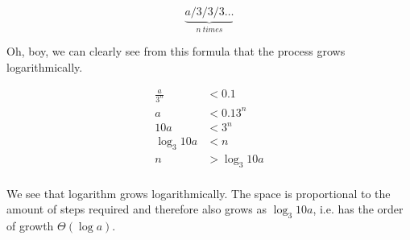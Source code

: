 \begin{equation}
	\underbrace{a / 3 / 3 / 3 \dots}_{n\ times}
\end{equation}

Oh, boy, we can clearly see from this formula that the process grows logarithmically.

\[
	\begin{aligned}
		\frac {a} {3^n} &< 0.1 \\
		a &< 0.1 3^n \\
		10 a &< 3^n \\
		\log _3 10 a &< n \\
		n &> \log _3 10 a \\
	\end{aligned}
\]

We see that logarithm grows logarithmically. The space is proportional to the amount of steps required and therefore also grows as $\log _3 10 a$, i.e. has the order of growth $\Theta(\log a)$.
